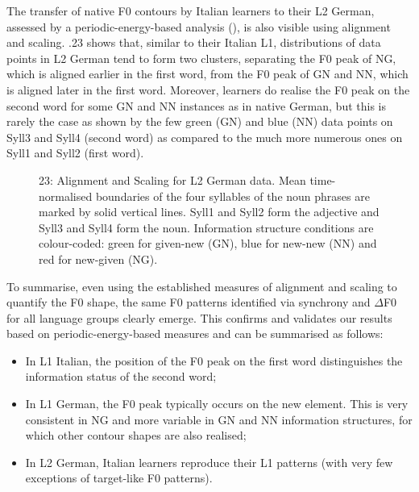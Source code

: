 The transfer of native F0 contours by Italian learners to their L2 German, assessed by a periodic-energy-based analysis (), is also visible using alignment and scaling. .23 shows that, similar to their Italian L1, distributions of data points in L2 German tend to form two clusters, separating the F0 peak of NG, which is aligned earlier in the first word, from the F0 peak of GN and NN, which is aligned later in the first word. Moreover, learners do realise the F0 peak on the second word for some GN and NN instances as in native German, but this is rarely the case as shown by the few green (GN) and blue (NN) data points on Syll3 and Syll4 (second word) as compared to the much more numerous ones on Syll1 and Syll2 (first word).

\begin{stylecaption}
  
 
\end{stylecaption}

\begin{stylecaption}\begin{figure}
\caption{23: Alignment and Scaling for L2 German data. Mean time-normalised boundaries of the four syllables of the noun phrases are marked by solid vertical lines. Syll1 and Syll2 form the adjective and Syll3 and Syll4 form the noun. Information structure conditions are colour-coded: green for given-new (GN), blue for new-new (NN) and red for new-given (NG).}
\label{fig:key:2}
\end{figure}\end{stylecaption}

To summarise, even using the established measures of alignment and scaling to quantify the F0 shape, the same F0 patterns identified via synchrony and ${\Delta}$F0 for all language groups clearly emerge. This confirms and validates our results based on periodic-energy-based measures and can be summarised as follows:

\begin{itemize}
\item In L1 Italian, the position of the F0 peak on the first word distinguishes the information status of the second word;
\item In L1 German, the F0 peak typically occurs on the new element. This is very consistent in NG and more variable in GN and NN information structures, for which other contour shapes are also realised;
\item In L2 German, Italian learners reproduce their L1 patterns (with very few exceptions of target-like F0 patterns).
\end{itemize}
